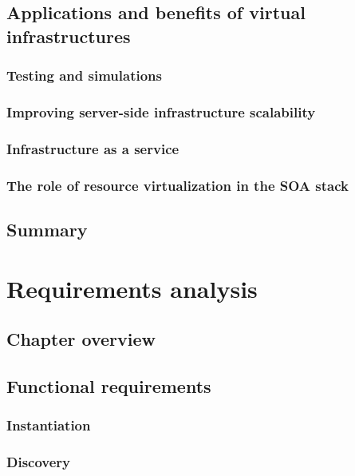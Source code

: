 \documentclass[11pt]{book}
\begin{document}
    \section{Applications and benefits of virtual infrastructures}

      \subsection{Testing and simulations}

      \subsection{Improving server-side infrastructure scalability}

      \subsection{Infrastructure as a service}

      \subsection{The role of resource virtualization in the SOA stack}


    \section*{Summary}


  \chapter{Requirements analysis}
    
    \section*{Chapter overview}

    \section{Functional requirements}

      \subsection{Instantiation}

      \subsection{Discovery}
\end{document}
